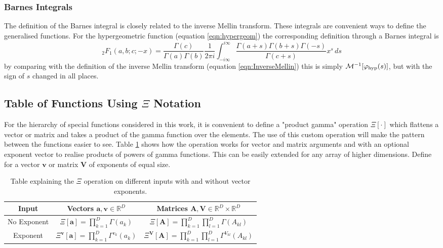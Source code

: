 \documentclass[journal=jcisd8,manuscript=article,layout=onecolumn,pdftex,floatfix,amsmath,amssymb,10pt]{achemso}
\begin{document}
\subsubsection{Barnes Integrals}
\label{sec:BarnesIntegral}
The definition of the Barnes integral is closely related to the inverse Mellin transform. These integrals are convenient ways to define the generalised functions. For the hypergeometric function (equation \ref{eqn:hypergeom}) the corresponding definition through a Barnes integral is
\begin{equation}
_2F_1(a,b;c;-x) =\frac{\Gamma(c)}{\Gamma(a)\Gamma(b)} \frac{1}{2\pi i} \int_{-i\infty}^{i\infty} \frac{\Gamma(a+s)\Gamma(b+s)\Gamma(-s)}{\Gamma(c+s)}x^s\,ds
\end{equation}
by comparing with the definition of the inverse Mellin transform (equation \ref{eqn:InverseMellin}) this is simply $\mathcal{M}^{-1}[\varphi_{\rm hyp}(s)]$, but with the sign of $s$ changed in all places.

\subsection{Table of Functions Using $\Xi$ Notation}
For the hierarchy of special functions considered in this work, it is convenient to define a "product gamma" operation $\Xi[\cdot]$ which flattens a vector or matrix and takes a product of the gamma function over the elements. The use of this custom operation will make the pattern between the functions easier to see. Table \ref{tab:Xi} shows how the operation works for vector and matrix arguments and with an optional exponent vector to realise products of powers of gamma functions. This can be easily extended for any array of higher dimensions. Define for a vector $\mathbf{v}$ or matrix $\mathbf{V}$ of exponents of equal size.
\begin{table}
\begin{tabular}{|c|c|c|}
\hline
Input & Vectors $\mathbf{a,v} \in \mathbb{R}^D$ & Matrices $\mathbf{A,V} \in \mathbb{R}^D\times \mathbb{R}^D$ \\
\hline
No Exponent & $\Xi[\mathbf{a}] = \prod_{k=1}^D \Gamma(a_k)$ & $\Xi[\mathbf{A}] = \prod_{k=1}^D\prod_{l=1}^D \Gamma(A_{kl})$ \\
Exponent & $\Xi^\mathbf{v}[\mathbf{a}] = \prod_{k=1}^D \Gamma^{v_k}(a_k)$ & $\Xi^\mathbf{V}[\mathbf{A}] = \prod_{k=1}^D\prod_{l=1}^D \Gamma^{V_{kl}}(A_{kl})$\\
\hline
\end{tabular}
\caption{Table explaining the $\Xi$ operation on different inputs with and without vector exponents.}
\label{tab:Xi}
\end{table}
\end{document}
